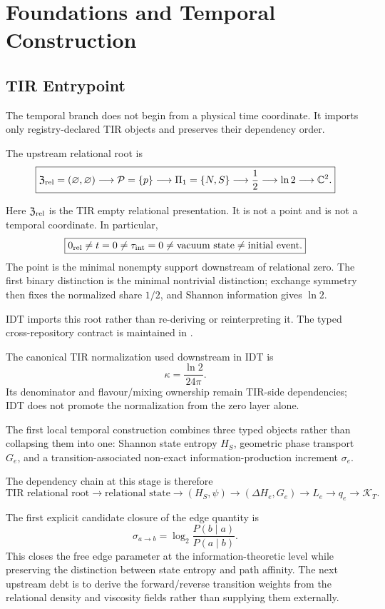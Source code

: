 \documentclass[11pt]{book}
\begin{document}
\tableofcontents
\mainmatter
\part{Foundations and Temporal Construction}
\chapter{TIR Entrypoint}

The temporal branch does not begin from a physical time coordinate. It imports only registry-declared TIR objects and preserves their dependency order.

The upstream relational root is
\[
\boxed{
\mathfrak Z_{\rm rel}
=
(\varnothing,\varnothing)
\longrightarrow
\mathcal P=\{p\}
\longrightarrow
\Pi_1=\{N,S\}
\longrightarrow
\frac12
\longrightarrow
\ln2
\longrightarrow
\mathbb C^2.
}
\]

Here $\mathfrak Z_{\rm rel}$ is the TIR empty relational presentation. It is not a point and is not a temporal coordinate. In particular,
\[
\boxed{
0_{\rm rel}
\neq
t=0
\neq
\tau_{\rm int}=0
\neq
\text{vacuum state}
\neq
\text{initial event}.
}
\]
The point is the minimal nonempty support downstream of relational zero. The first binary distinction is the minimal nontrivial distinction; exchange symmetry then fixes the normalized share $1/2$, and Shannon information gives $\ln2$.

IDT imports this root rather than re-deriving or reinterpreting it. The typed cross-repository contract is maintained in
.

The canonical TIR normalization used downstream in IDT is
\[
\kappa=\frac{\ln2}{24\pi}.
\]
Its denominator and flavour/mixing ownership remain TIR-side dependencies; IDT does not promote the normalization from the zero layer alone.

The first local temporal construction combines three typed objects rather than collapsing them into one: Shannon state entropy $H_S$, geometric phase transport $G_e$, and a transition-associated non-exact information-production increment $\sigma_e$.

The dependency chain at this stage is therefore
\[
\boxed{
\text{TIR relational root}
\longrightarrow
\text{relational state}
\longrightarrow
(H_S,\psi)
\longrightarrow
(\Delta H_e,G_e)
\longrightarrow
L_e
\longrightarrow
q_e
\longrightarrow
\mathcal K_T.
}
\]

The first explicit candidate closure of the edge quantity is
\[
\sigma_{a\to b}=\log_2\frac{P(b\mid a)}{P(a\mid b)}.
\]
This closes the free edge parameter at the information-theoretic level while preserving the distinction between state entropy and path affinity. The next upstream debt is to derive the forward/reverse transition weights from the relational density and viscosity fields rather than supplying them externally.
\end{document}

